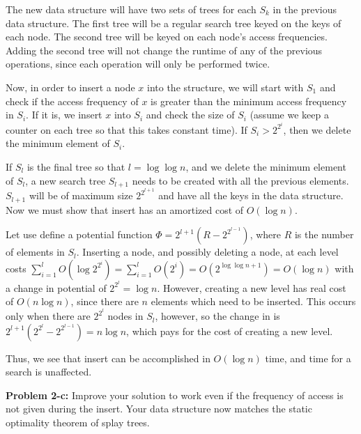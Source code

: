\documentclass[psamsfonts]{amsart}
\newenvironment{sol}{\vspace{0.25cm}{\large \bfseries Solution:}}{\qedsymbol}
\newenvironment{prob}[1]{\begin{framed}{\large \bfseries Problem #1:}}{\end{framed}}
\begin{document}
\begin{sol}
The new data structure will have two sets of trees for each $S_k$ in the previous data structure. The first tree will be a regular search tree keyed on the keys of each node. The second tree will be keyed on each node's access frequencies. Adding the second tree will not change the runtime of any of the previous operations, since each operation will only be performed twice. 

Now, in order to insert a node $x$ into the structure, we will start with $S_1$ and check if the access frequency of $x$ is greater than the minimum access frequency in $S_i$. If it is, we insert $x$ into $S_i$ and check the size of $S_i$ (assume we keep a counter on each tree so that this takes constant time). If $S_i > 2^{2^i}$, then we delete the minimum element of $S_i$. 

If $S_l$ is the final tree so that $l = \log \log n$, and we delete the minimum element of $S_l$, a new search tree $S_{l+1}$ needs to be created with all the previous elements. $S_{l+1}$ will be of maximum size $2^{2^{l+1}}$ and have all the keys in the data structure. Now we must show that insert has an amortized cost of $O(\log n)$. 

Let use define a potential function $\Phi = 2^{l+1}(R - 2^{2^{l-1}})$, where $R$ is the number of elements in $S_l$. Inserting a node, and possibly deleting a node, at each level costs $\sum_{i=1}^l O(\log 2^{2^{i}}) = \sum_{i=1}^l O(2^i) = O(2^{\log \log n + 1}) = O(\log n)$ with a change in potential of $2^{2^{l}} = \log n$. However, creating a new level has real cost of $O(n \log n)$, since there are $n$ elements which need to be inserted. This occurs only when there are $2^{2^l}$ nodes in $S_l$, however, so the change in is $2^{l+1}(2^{2^l} - 2^{2^{l-1}}) = n \log n$, which pays for the cost of creating a new level.

Thus, we see that insert can be accomplished in $O(\log n)$ time, and time for a search is unaffected.
\end{sol}

\begin{prob}{2-c}
Improve your solution to work even if the frequency of access is not given during the insert. Your data structure now matches the static optimality theorem of splay trees.
\end{prob}
\end{document}
